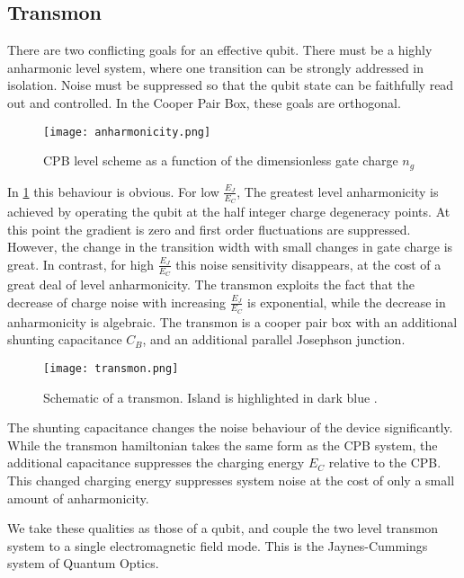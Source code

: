 \subsection{Transmon}
There are two conflicting goals for an effective qubit. 
There must be a highly anharmonic level system, where one transition can be strongly addressed in isolation. 
Noise must be suppressed so that the qubit state can be faithfully read out and controlled. 
In the Cooper Pair Box, these goals are orthogonal.
\begin{figure}[t]
  \texttt{[image: anharmonicity.png]}
  \caption{CPB level scheme as a function of the dimensionless gate charge $n_g$ \cite{Koch2007}}
  \label{anharmonicity}
\end{figure}
In \ref{anharmonicity} this behaviour is obvious. 
For low $\frac{E_J}{E_C}$, The greatest level anharmonicity is achieved by operating the qubit at the half integer charge degeneracy points.
At this point the gradient is zero and first order fluctuations are suppressed. 
However, the change in the transition width with small changes in gate charge is great. 
In contrast, for high $\frac{E_J}{E_C}$ this noise sensitivity disappears, at the cost of a great deal of level anharmonicity.
The transmon exploits the fact that the decrease of charge noise with increasing $\frac{E_J}{E_C}$ is exponential, while the decrease in anharmonicity is algebraic.
The transmon is a cooper pair box with an additional shunting capacitance $C_B$, and an additional parallel Josephson junction.
\begin{figure}[t]
  \texttt{[image: transmon.png]}
  \caption{Schematic of a transmon. Island is highlighted in dark blue \cite{Koch2007}.}
\end{figure}
The shunting capacitance changes the noise behaviour of the device significantly.
While the transmon hamiltonian takes the same form as the CPB system, the additional capacitance suppresses the charging energy $E_C$ relative to the CPB.
This changed charging energy suppresses system noise at the cost of only a small amount of anharmonicity. 

We take these qualities as those of a qubit, and couple the two level transmon system to a single electromagnetic field mode.
This is the Jaynes-Cummings system of Quantum Optics.
